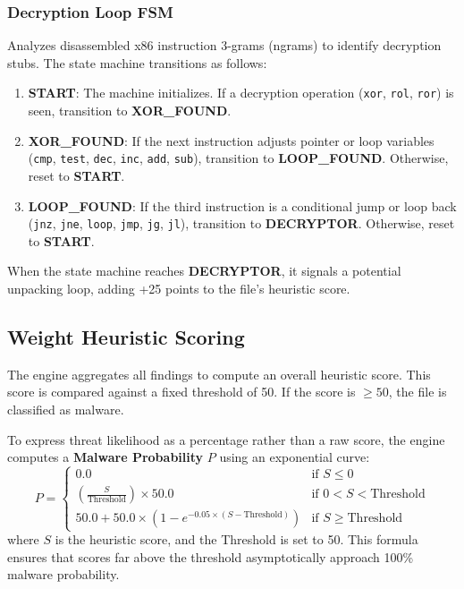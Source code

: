 \documentclass[11pt,a4paper]{article}
\begin{document}
\subsubsection{Decryption Loop FSM}
Analyzes disassembled x86 instruction 3-grams (ngrams) to identify decryption stubs. The state machine transitions as follows:
\begin{enumerate}
    \item \textbf{START}: The machine initializes. If a decryption operation (\texttt{xor}, \texttt{rol}, \texttt{ror}) is seen, transition to \textbf{XOR\_FOUND}.
    \item \textbf{XOR\_FOUND}: If the next instruction adjusts pointer or loop variables (\texttt{cmp}, \texttt{test}, \texttt{dec}, \texttt{inc}, \texttt{add}, \texttt{sub}), transition to \textbf{LOOP\_FOUND}. Otherwise, reset to \textbf{START}.
    \item \textbf{LOOP\_FOUND}: If the third instruction is a conditional jump or loop back (\texttt{jnz}, \texttt{jne}, \texttt{loop}, \texttt{jmp}, \texttt{jg}, \texttt{jl}), transition to \textbf{DECRYPTOR}. Otherwise, reset to \textbf{START}.
\end{enumerate}
When the state machine reaches \textbf{DECRYPTOR}, it signals a potential unpacking loop, adding +25 points to the file's heuristic score.

\subsection{Weight Heuristic Scoring}
The engine aggregates all findings to compute an overall heuristic score. This score is compared against a fixed threshold of 50. If the score is $\ge 50$, the file is classified as malware.

To express threat likelihood as a percentage rather than a raw score, the engine computes a \textbf{Malware Probability} $P$ using an exponential curve:
\begin{equation}
    P = 
    \begin{cases} 
      0.0 & \text{if } S \le 0 \\
      \left(\frac{S}{\text{Threshold}}\right) \times 50.0 & \text{if } 0 < S < \text{Threshold} \\
      50.0 + 50.0 \times \left(1 - e^{-0.05 \times (S - \text{Threshold})}\right) & \text{if } S \ge \text{Threshold}
   \end{cases}
\end{equation}
where $S$ is the heuristic score, and the Threshold is set to 50. This formula ensures that scores far above the threshold asymptotically approach 100\% malware probability.
\end{document}
